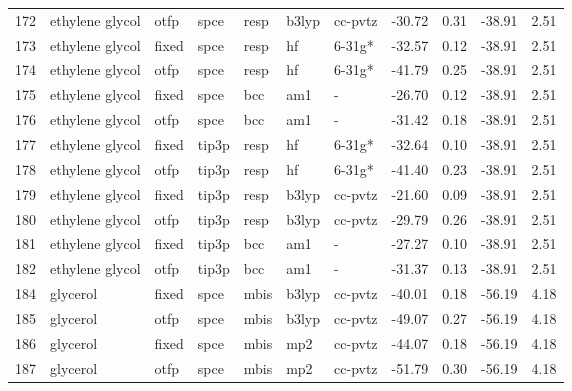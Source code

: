 \begin{tabular}{lllllllrrrr}
172 &               ethylene glycol &   otfp &   spce &   resp &   b3lyp &      cc-pvtz &      -30.72 &     0.31 &      -38.91 &      2.51 \\
173 &               ethylene glycol &  fixed &   spce &   resp &      hf &       6-31g* &      -32.57 &     0.12 &      -38.91 &      2.51 \\
174 &               ethylene glycol &   otfp &   spce &   resp &      hf &       6-31g* &      -41.79 &     0.25 &      -38.91 &      2.51 \\
175 &               ethylene glycol &  fixed &   spce &    bcc &     am1 &            - &      -26.70 &     0.12 &      -38.91 &      2.51 \\
176 &               ethylene glycol &   otfp &   spce &    bcc &     am1 &            - &      -31.42 &     0.18 &      -38.91 &      2.51 \\
177 &               ethylene glycol &  fixed &  tip3p &   resp &      hf &       6-31g* &      -32.64 &     0.10 &      -38.91 &      2.51 \\
178 &               ethylene glycol &   otfp &  tip3p &   resp &      hf &       6-31g* &      -41.40 &     0.23 &      -38.91 &      2.51 \\
179 &               ethylene glycol &  fixed &  tip3p &   resp &   b3lyp &      cc-pvtz &      -21.60 &     0.09 &      -38.91 &      2.51 \\
180 &               ethylene glycol &   otfp &  tip3p &   resp &   b3lyp &      cc-pvtz &      -29.79 &     0.26 &      -38.91 &      2.51 \\
181 &               ethylene glycol &  fixed &  tip3p &    bcc &     am1 &            - &      -27.27 &     0.10 &      -38.91 &      2.51 \\
182 &               ethylene glycol &   otfp &  tip3p &    bcc &     am1 &            - &      -31.37 &     0.13 &      -38.91 &      2.51 \\
184 &                      glycerol &  fixed &   spce &   mbis &   b3lyp &      cc-pvtz &      -40.01 &     0.18 &      -56.19 &      4.18 \\
185 &                      glycerol &   otfp &   spce &   mbis &   b3lyp &      cc-pvtz &      -49.07 &     0.27 &      -56.19 &      4.18 \\
186 &                      glycerol &  fixed &   spce &   mbis &     mp2 &      cc-pvtz &      -44.07 &     0.18 &      -56.19 &      4.18 \\
187 &                      glycerol &   otfp &   spce &   mbis &     mp2 &      cc-pvtz &      -51.79 &     0.30 &      -56.19 &      4.18 \\

\end{tabular}
